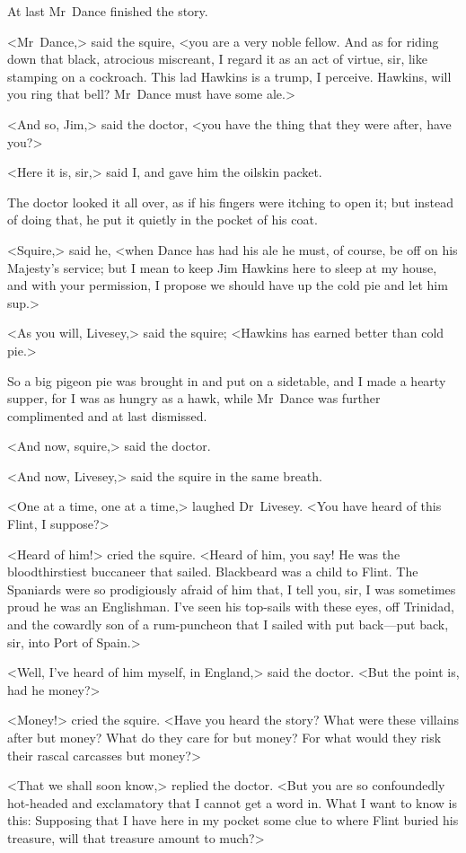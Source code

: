 At last Mr~Dance finished the story.

<Mr~Dance,> said the squire, <you are a very noble fellow. And as for riding down that black, atrocious miscreant, I regard it as an act of virtue, sir, like stamping on a cockroach. This lad Hawkins is a trump, I perceive. Hawkins, will you ring that bell? Mr~Dance must have some ale.>

<And so, Jim,> said the doctor, <you have the thing that they were after, have you?>

<Here it is, sir,> said I, and gave him the oilskin packet.

The doctor looked it all over, as if his fingers were itching to open it; but instead of doing that, he put it quietly in the pocket of his coat.

<Squire,> said he, <when Dance has had his ale he must, of course, be off on his Majesty's service; but I mean to keep Jim Hawkins here to sleep at my house, and with your permission, I propose we should have up the cold pie and let him sup.>

<As you will, Livesey,> said the squire; <Hawkins has earned better than cold pie.>

So a big pigeon pie was brought in and put on a sidetable, and I made a hearty supper, for I was as hungry as a hawk, while Mr~Dance was further complimented and at last dismissed.

<And now, squire,> said the doctor.

<And now, Livesey,> said the squire in the same breath.

<One at a time, one at a time,> laughed Dr~Livesey. <You have heard of this Flint, I suppose?>

<Heard of him!> cried the squire. <Heard of him, you say! He was the bloodthirstiest buccaneer that sailed. Blackbeard was a child to Flint. The Spaniards were so prodigiously afraid of him that, I tell you, sir, I was sometimes proud he was an Englishman. I've seen his top-sails with these eyes, off Trinidad, and the cowardly son of a rum-puncheon that I sailed with put back—put back, sir, into Port of Spain.>

<Well, I've heard of him myself, in England,> said the doctor. <But the point is, had he money?>

<Money!> cried the squire. <Have you heard the story? What were these villains after but money? What do they care for but money? For what would they risk their rascal carcasses but money?>

<That we shall soon know,> replied the doctor. <But you are so confoundedly hot-headed and exclamatory that I cannot get a word in. What I want to know is this: Supposing that I have here in my pocket some clue to where Flint buried his treasure, will that treasure amount to much?>

